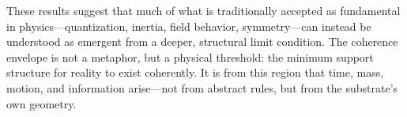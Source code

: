 \documentclass[entropy,article,submit,pdftex,moreauthors]{Definitions/mdpi}
\begin{document}
These results suggest that much of what is traditionally accepted as fundamental in physics—quantization, inertia, field behavior, symmetry—can instead be understood as emergent from a deeper, structural limit condition. The coherence envelope is not a metaphor, but a physical threshold: the minimum support structure for reality to exist coherently. It is from this region that time, mass, motion, and information arise—not from abstract rules, but from the substrate’s own geometry.

\vspace{6pt} 




\end{document}
